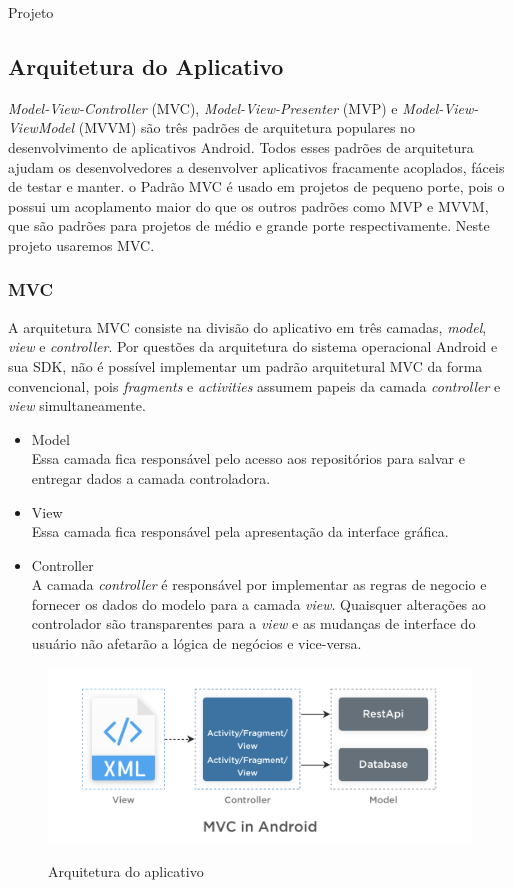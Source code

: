 \documentclass[
	12pt,				%
	openright,			%
	twoside,			%
	a4paper,			%
	english,			%
	french,				%
	spanish,			%
	brazil				%
	]{abntex2}
\begin{document}
\begin{chapter}{Projeto}
\subsection{Arquitetura do Aplicativo}
\textit{Model-View-Controller} (MVC),  \textit{Model-View-Presenter} (MVP) e \textit{Model-View-ViewModel} (MVVM) são três padrões de arquitetura populares no desenvolvimento de aplicativos Android. Todos esses padrões de arquitetura ajudam os desenvolvedores a desenvolver aplicativos fracamente acoplados, fáceis de testar e manter. o Padrão MVC é usado em projetos de pequeno porte, pois o possui um acoplamento maior do que os outros padrões como MVP e MVVM, que são padrões para projetos de médio e grande porte respectivamente. Neste projeto usaremos MVC.\\

\subsubsection{MVC}
A arquitetura MVC consiste na divisão do aplicativo em três camadas,  \textit{model}, \textit{view} e \textit{controller}. Por questões da arquitetura do sistema operacional Android e sua SDK, não é possível implementar um padrão arquitetural MVC da forma convencional, pois \textit{fragments} e \textit{activities} assumem papeis da camada \textit{controller} e \textit{view} simultaneamente.

\begin{itemize}
  \item{Model}\\ Essa camada fica responsável pelo acesso aos repositórios para salvar e entregar dados a camada controladora.
     \item{View}\\ Essa camada fica responsável pela apresentação da interface gráfica.
       \item{Controller}\\ A camada \textit{controller} é responsável por implementar as regras de negocio e fornecer os dados do modelo para a camada \textit{view}. Quaisquer alterações ao controlador são transparentes para a \textit{view} e as mudanças de interface do usuário não afetarão a lógica de negócios e vice-versa.
\end{itemize}

\begin{figure}[h]
\centering
   \caption{Arquitetura do aplicativo}
   \includegraphics[scale=0.40]{media/MVC.png}
     \label{fig:arquitetura_mvc}
\end{figure}



\end{chapter}
\end{document}
